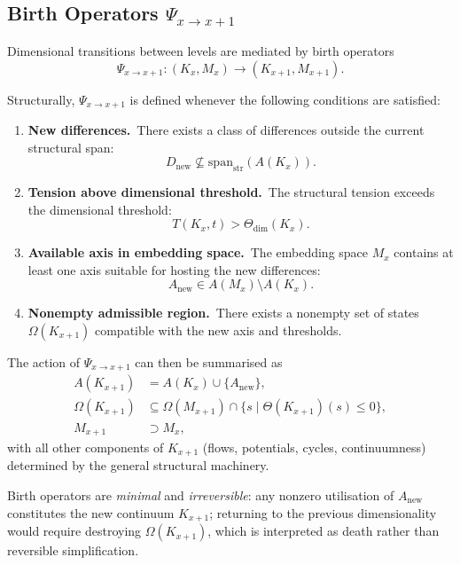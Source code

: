 \subsection{Birth Operators \texorpdfstring{$\Psi_{x\to x+1}$}{Psi\_x→x+1}}
\label{sec:birth-operators}

Dimensional transitions between levels are mediated by birth operators
\[
  \Psi_{x\to x+1} : (K_x, M_x) \longrightarrow (K_{x+1}, M_{x+1}).
\]

Structurally, \(\Psi_{x\to x+1}\) is defined whenever the following conditions
are satisfied:
\begin{enumerate}
  \item \textbf{New differences.}\
        There exists a class of differences outside the current structural
        span:
        \[
          D_{\mathrm{new}}\not\subseteq
          \mathrm{span}_{\mathrm{str}}(A(K_x)).
        \]
  \item \textbf{Tension above dimensional threshold.}\
        The structural tension exceeds the dimensional threshold:
        \[
          T(K_x,t) > \Theta_{\mathrm{dim}}(K_x).
        \]
  \item \textbf{Available axis in embedding space.}\
        The embedding space \(M_x\) contains at least one axis suitable for
        hosting the new differences:
        \[
          A_{\mathrm{new}} \in A(M_x) \setminus A(K_x).
        \]
  \item \textbf{Nonempty admissible region.}\
        There exists a nonempty set of states \(\Omega(K_{x+1})\) compatible
        with the new axis and thresholds.
\end{enumerate}

The action of \(\Psi_{x\to x+1}\) can then be summarised as
\begin{align*}
  A(K_{x+1})      &= A(K_x) \cup \{A_{\mathrm{new}}\}, \\
  \Omega(K_{x+1}) &\subseteq
     \Omega(M_{x+1}) \cap
     \big\{ s \mid \Theta(K_{x+1})(s) \le 0 \big\}, \\
  M_{x+1}         &\supset M_x,
\end{align*}
with all other components of \(K_{x+1}\) (flows, potentials, cycles,
continuumness) determined by the general structural machinery.

Birth operators are \emph{minimal} and \emph{irreversible}:
any nonzero utilisation of \(A_{\mathrm{new}}\) constitutes the new continuum
\(K_{x+1}\); returning to the previous dimensionality would require destroying
\(\Omega(K_{x+1})\), which is interpreted as death rather than reversible
simplification.

